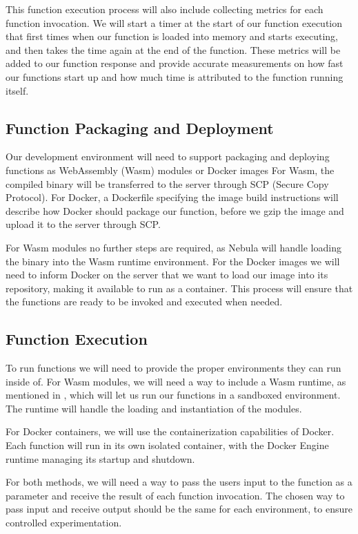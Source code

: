 \documentclass[
  table]{report}
\begin{document}
This function execution process will also include collecting metrics for
each function invocation. We will start a timer at the start of our
function execution that first times when our function is loaded into
memory and starts executing, and then takes the time again at the end of
the function. These metrics will be added to our function response and
provide accurate measurements on how fast our functions start up and how
much time is attributed to the function running itself.

\subsection{Function Packaging and Deployment}

Our development environment will need to support packaging and deploying
functions as WebAssembly (Wasm) modules or Docker images For Wasm, the
compiled binary will be transferred to the server through SCP (Secure
Copy Protocol). For Docker, a Dockerfile specifying the image build
instructions will describe how Docker should package our function,
before we gzip the image and upload it to the server through SCP.

For Wasm modules no further steps are required, as Nebula will handle
loading the binary into the Wasm runtime environment. For the Docker
images we will need to inform Docker on the server that we want to load
our image into its repository, making it available to run as a
container. This process will ensure that the functions are ready to be
invoked and executed when needed.

\subsection{Function Execution}

To run functions we will need to provide the proper environments they
can run inside of. For \ac{Wasm} modules, we will need a way to include
a \ac{Wasm} runtime, as mentioned in , which
will let us run our functions in a sandboxed environment. The runtime
will handle the loading and instantiation of the modules.

For Docker containers, we will use the containerization capabilities of
Docker. Each function will run in its own isolated container, with the
Docker Engine runtime managing its startup and shutdown.

For both methods, we will need a way to pass the users input to the
function as a parameter and receive the result of each function
invocation. The chosen way to pass input and receive output should be
the same for each environment, to ensure controlled experimentation.
\end{document}
